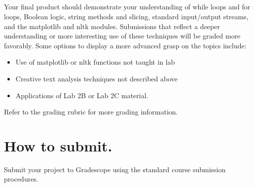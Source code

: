 \documentclass[11pt, letterpaper, onecolumn, oneside, final]{article}
\begin{document}
    \\
    \\
    \\ 
    \\
    Your final product should demonstrate your understanding of while loops and for loops, Boolean logic, string methods and slicing, standard input/output streams, and the {\consolas matplotlib} and {\consolas nltk} modules.
    Submissions that reflect a deeper understanding or more interesting use of these techniques will be graded more favorably. Some options to display a more advanced grasp on the topics include:
\begin{itemize}
    \item Use of {\consolas matplotlib} or {\consolas nltk} functions not taught in lab
    \item Creative text analysis techniques not described above
    \item Applications of Lab 2B or Lab 2C material.
\end{itemize}
    Refer to the grading rubric for more grading information.
    
\section{How to submit.}

    Submit your project to Gradescope using the standard course submission procedures. 
\end{document}
